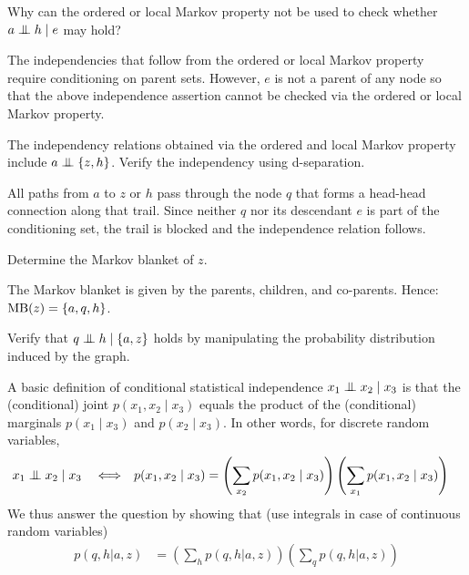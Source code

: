 \begin{exenumerate}
  \item Why can the ordered or local Markov property not be used to check whether $a \mathrel{\perp\mspace{-10mu}\perp} h \mid e$ may hold? 
    \begin{solution}
      The independencies that follow from the ordered or local Markov property require conditioning on parent sets. However, $e$ is not a parent of any node so that the above independence assertion cannot be checked via the ordered or local Markov property. 
      \end{solution}

  \item The independency relations obtained via the ordered and local Markov property include $a \mathrel{\perp\mspace{-10mu}\perp} \{z,h\}$. Verify the independency using d-separation.

    \begin{solution}
      All paths from $a$ to $z$ or $h$ pass through the node $q$ that forms a head-head connection along that trail. Since neither $q$ nor its descendant $e$ is part of the conditioning set, the trail is blocked and the independence relation follows.
  \end{solution}
    
    
  \item Determine the Markov blanket of $z$.
    \begin{solution}
      The Markov blanket is given by the parents, children, and co-parents. Hence: $\textrm{MB}(z) = \{a,q,h\}$.
    \end{solution}

    
  \item Verify that  $ q \mathrel{\perp\mspace{-10mu}\perp}  h \mid \{a,z\}$  holds by manipulating the probability distribution induced by the graph.
    \begin{solution}

      A basic definition of conditional statistical independence $x_1
      \mathrel{\perp\mspace{-10mu}\perp} x_2 \mid x_3$ is that the (conditional) joint
      $p(x_1, x_2 \mid x_3)$ equals the product of the (conditional)
      marginals $p(x_1 \mid x_3)$ and $p(x_2 \mid x_3)$. In other
      words, for discrete random variables,
      \begin{align}
        x_1 &\mathrel{\perp\mspace{-10mu}\perp} x_2 \mid x_3 &  &\Longleftrightarrow &  p(x_1, x_2 \mid x_3) &= \left( \sum_{x_2}  p(x_1, x_2 \mid x_3) \right) \left( \sum_{x_1}  p(x_1, x_2 \mid x_3) \right)
      \end{align}
      We thus answer the question by showing that (use integrals in
      case of continuous random variables)
      \begin{align}
      p(q,h | a,z) &= \left(\sum_h  p(q,h | a,z)\right) \left( \sum_q  p(q,h | a,z)\right)
      \end{align}


\end{solution}
\end{exenumerate}
